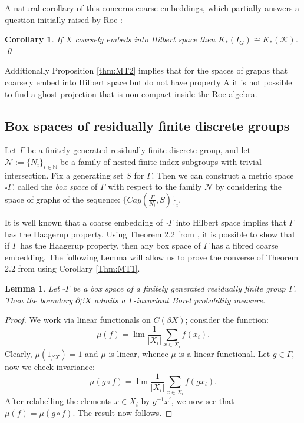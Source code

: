 \documentclass[preprint]{elsarticle}
\theoremstyle{plain}
\newtheorem{lemma}[theorem]{Lemma}%
\newtheorem{corollary}[theorem]{Corollary}%
\theoremstyle{definition}%
\theoremstyle{remark}%
\begin{document}
A natural corollary of this concerns coarse embeddings, which partially answers a question initially raised by Roe \cite[Chapter 11]{MR2007488}:

\begin{corollary}\label{thm:IT3}
If $X$ coarsely embeds into Hilbert space then $K_{*}(I_{G}) \cong K_{*}(\mathcal{K})$. \qed
\end{corollary}

Additionally Proposition \ref{thm:MT2} implies that for the spaces of graphs that coarsely embed into Hilbert space but do not have property A \cite{MR2899681,MR2920843} it is not possible to find a ghost projection that is non-compact inside the Roe algebra. 

\subsection{Box spaces of residually finite discrete groups}
Let $\Gamma$ be a finitely generated residually finite discrete group, and let $\mathcal{N}:=\lbrace N_{i} \rbrace_{i\in\mathbb{N}}$ be a family of nested finite index subgroups with trivial intersection. Fix a generating set $S$ for $\Gamma$. Then we can construct a metric space $\square \Gamma$, called the \textit{box space} of $\Gamma$ with respect to the family $\mathcal{N}$ by considering the space of graphs of the sequence: $\lbrace Cay(\frac{\Gamma}{N_{i}},S) \rbrace_{i}$. 

It is well known \cite[Proposition 11.26]{MR2007488} that a coarse embedding of $\square \Gamma$ into Hilbert space implies that $\Gamma$ has the Haagerup property. Using Theorem 2.2 from \cite{FCEpaper}, it is possible to show that if $\Gamma$ has the Haagerup property, then any box space of $\Gamma$ has a fibred coarse embedding. The following Lemma will allow us to prove the converse of Theorem 2.2 from \cite{FCEpaper} using Corollary \ref{Thm:MT1}.

\begin{lemma}\label{lem:cor2}
Let $\square \Gamma$ be a box space of a finitely generated residually finite group $\Gamma$. Then the boundary $\partial\beta X$ admits a $\Gamma$-invariant Borel probability measure.
\end{lemma}
\begin{proof}
We work via linear functionals on $C(\beta X)$; consider the function:
\begin{equation*}
\mu(f)=\lim \frac{1}{\vert X_{i} \vert}\sum_{x \in X_{i}}f(x_{i}).
\end{equation*}
Clearly, $\mu(1_{\beta X})=1$ and $\mu$ is linear, whence $\mu$ is a linear functional. Let $g \in \Gamma$, now we check invariance:
\begin{equation*}
\mu(g\circ f)=\lim \frac{1}{\vert X_{i} \vert}\sum_{x \in X_{i}}f(gx_{i}).
\end{equation*}
After relabelling the elements $x \in X_{i}$ by $g^{-1}x^{'}$, we now see that $\mu(f)=\mu(g \circ f)$. The result now follows.
\end{proof}
\end{document}
